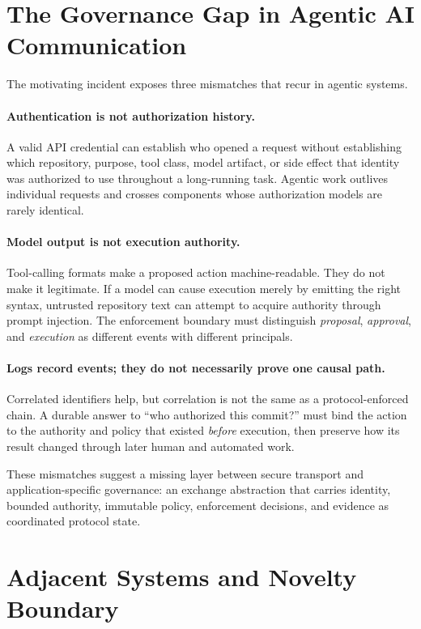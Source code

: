\documentclass[10pt]{article}
\begin{document}
\section{The Governance Gap in Agentic AI Communication}

The motivating incident exposes three mismatches that recur in agentic systems.

\paragraph{Authentication is not authorization history.}
A valid API credential can establish who opened a request without establishing which repository, purpose, tool class, model artifact, or side effect that identity was authorized to use throughout a long-running task. Agentic work outlives individual requests and crosses components whose authorization models are rarely identical.

\paragraph{Model output is not execution authority.}
Tool-calling formats make a proposed action machine-readable. They do not make it legitimate. If a model can cause execution merely by emitting the right syntax, untrusted repository text can attempt to acquire authority through prompt injection. The enforcement boundary must distinguish \emph{proposal}, \emph{approval}, and \emph{execution} as different events with different principals.

\paragraph{Logs record events; they do not necessarily prove one causal path.}
Correlated identifiers help, but correlation is not the same as a protocol-enforced chain. A durable answer to ``who authorized this commit?'' must bind the action to the authority and policy that existed \emph{before} execution, then preserve how its result changed through later human and automated work.

These mismatches suggest a missing layer between secure transport and application-specific governance: an exchange abstraction that carries identity, bounded authority, immutable policy, enforcement decisions, and evidence as coordinated protocol state.

\section{Adjacent Systems and Novelty Boundary}
\end{document}
